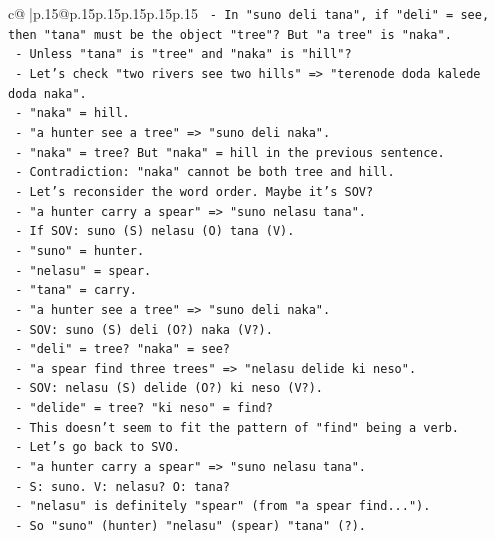 \documentclass{article}
\begin{document}
{\begin{supertabular}{c@{$\;$}|p{.15\linewidth}@{}p{.15\linewidth}p{.15\linewidth}p{.15\linewidth}p{.15\linewidth}p{.15\linewidth}}
{{{\texttt{          {-} In "suno deli tana", if "deli" = see, then "tana" must be the object "tree"? But "a tree" is "naka".} \\
\texttt{          {-} Unless "tana" is "tree" and "naka" is "hill"?} \\
\texttt{          {-} Let's check "two rivers see two hills" => "terenode doda kalede doda naka".} \\
\texttt{            {-} "naka" = hill.} \\
\texttt{          {-} "a hunter see a tree" => "suno deli naka".} \\
\texttt{            {-} "naka" = tree? But "naka" = hill in the previous sentence.} \\
\texttt{            {-} Contradiction: "naka" cannot be both tree and hill.} \\
\texttt{     {-} Let's reconsider the word order. Maybe it's SOV?} \\
\texttt{       {-} "a hunter carry a spear" => "suno nelasu tana".} \\
\texttt{         {-} If SOV: suno (S) nelasu (O) tana (V).} \\
\texttt{         {-} "suno" = hunter.} \\
\texttt{         {-} "nelasu" = spear.} \\
\texttt{         {-} "tana" = carry.} \\
\texttt{       {-} "a hunter see a tree" => "suno deli naka".} \\
\texttt{         {-} SOV: suno (S) deli (O?) naka (V?).} \\
\texttt{         {-} "deli" = tree? "naka" = see?} \\
\texttt{         {-} "a spear find three trees" => "nelasu delide ki neso".} \\
\texttt{           {-} SOV: nelasu (S) delide (O?) ki neso (V?).} \\
\texttt{           {-} "delide" = tree? "ki neso" = find?} \\
\texttt{         {-} This doesn't seem to fit the pattern of "find" being a verb.} \\
\texttt{     {-} Let's go back to SVO.} \\
\texttt{       {-} "a hunter carry a spear" => "suno nelasu tana".} \\
\texttt{         {-} S: suno. V: nelasu? O: tana?} \\
\texttt{         {-} "nelasu" is definitely "spear" (from "a spear find...").} \\
\texttt{         {-} So "suno" (hunter) "nelasu" (spear) "tana" (?).} \\
}}}
\end{supertabular}}
\end{document}
